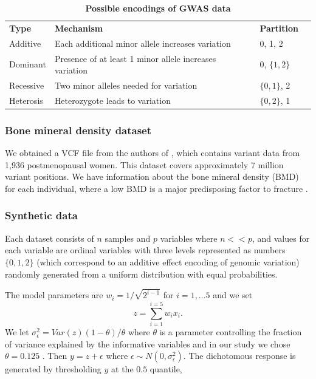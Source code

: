 \documentclass[10pt,letterpaper]{article}
\newlength\savedwidth
\newcommand\thickhline{\noalign{\global\savedwidth\arrayrulewidth\global\arrayrulewidth 2pt}%
\hline
\noalign{\global\arrayrulewidth\savedwidth}}
\begin{document}
\begin{table}[!ht]
\begin{flushleft} 
\centering
\caption{\bf Possible encodings of GWAS data \cite{Goldstein.et.al.2011}}
\begin{tabular}{|l|l|l|l||}
\hline
{\bf Type} & {\bf Mechanism}                                         & {\bf Partition} \\ 
\thickhline
Additive   & Each additional minor allele increases variation        & 0, 1, 2         \\
Dominant   & Presence of at least 1 minor allele increases variation & 0, $\{1,2\}$          \\
Recessive  & Two minor alleles needed for variation                  & $\{0,1\}$, 2          \\
Heterosis  & Heterozygote leads to variation                         & $\{0,2\}$, 1          \\ \hline
\end{tabular}
\label{table:encodings}
\end{flushleft}
\end{table}


\subsubsection{Bone mineral density dataset}
We obtained a VCF file from the authors of \cite{Duncan.2011}, which contains variant data from 1,936 postmenopausal women.
This dataset covers approximately 7 million variant positions. We have information about the bone mineral density (BMD)
for each individual, where a low BMD is a major predisposing factor to fracture \cite{Duncan.2011}. 

\subsubsection{Synthetic data} 
\label{section:synthetic_data}
 Each dataset consists of $n$ samples and $p$ variables where $n << p$,
and values for each variable are ordinal variables with three levels represented as numbers $\{0, 1, 2\}$ (which
correspond to an additive effect encoding of genomic variation) randomly generated from a uniform distribution with equal
probabilities.  

The model parameters are $w_i = 1/\sqrt{2^{i-1}}$ for $i =1,\ldots 5$ and we set 
\begin{equation}
\label{equation:synthetic.data}
z =  \sum_{i=1}^{i=5} {w_i x_i}.
\end{equation}
We let $\sigma_\epsilon^2 = Var(z)(1-\theta)/\theta $  where $\theta$ is a parameter controlling the fraction of variance explained by the informative variables and in our study we chose $\theta = 0.125$ . Then 
$y =   z + \epsilon$ where $\epsilon \sim  N(0, \sigma_\epsilon^2).$
The dichotomous response is generated by thresholding $y$ at the $0.5$ quantile,
\end{document}
